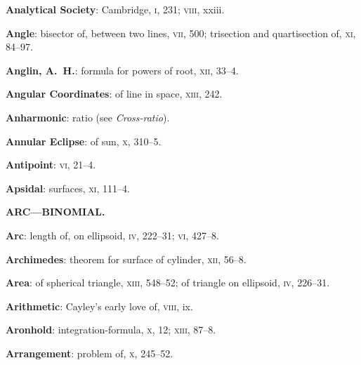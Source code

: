 \documentclass[11pt,a4paper]{book}
\begin{document}
\vspace{0.4em}
\textbf{Analytical Society}: Cambridge, \textsc{i}, 231; \textsc{viii}, xxiii.

\vspace{0.4em}
\textbf{Angle}: bisector of, between two lines, \textsc{vii}, 500; trisection and quartisection of, \textsc{xi}, 84--97.

\vspace{0.4em}
\textbf{Anglin, A.~H.}: formula for powers of root, \textsc{xii}, 33--4.

\vspace{0.4em}
\textbf{Angular Coordinates}: of line in space, \textsc{xiii}, 242.

\vspace{0.4em}
\textbf{Anharmonic}: ratio (see \textit{Cross-ratio}).

\vspace{0.4em}
\textbf{Annular Eclipse}: of sun, \textsc{x}, 310--5.

\vspace{0.4em}
\textbf{Antipoint}: \textsc{vi}, 21--4.

\vspace{0.4em}
\textbf{Apsidal}: surfaces, \textsc{xi}, 111--4.

\newpage
\thispagestyle{fancy}

\begin{center}
\textbf{ARC---BINOMIAL.}
\end{center}
\vspace{0.5em}

\textbf{Arc}: length of, on ellipsoid, \textsc{iv}, 222--31; \textsc{vi}, 427--8.

\vspace{0.4em}
\textbf{Archimedes}: theorem for surface of cylinder, \textsc{xii}, 56--8.

\vspace{0.4em}
\textbf{Area}: of spherical triangle, \textsc{xiii}, 548--52; of triangle on ellipsoid, \textsc{iv}, 226--31.

\vspace{0.4em}
\textbf{Arithmetic}: Cayley's early love of, \textsc{viii}, ix.

\vspace{0.4em}
\textbf{Aronhold}: integration-formula, \textsc{x}, 12; \textsc{xiii}, 87--8.

\vspace{0.4em}
\textbf{Arrangement}: problem of, \textsc{x}, 245--52.
\end{document}

